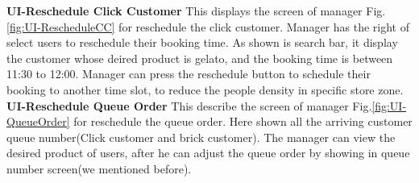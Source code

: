 \documentclass[a4paper,12pt]{report}
\begin{document}
\textbf{UI-Reschedule Click Customer} This displays the screen of manager Fig.\ref{fig:UI-RescheduleCC} for reschedule the click customer. Manager has the right of select users to reschedule their booking time.  As shown is search bar, it display the customer whose deired product is gelato, and the booking time is between 11:30 to 12:00. Manager can press the reschedule button to schedule their booking to another time slot, to reduce the people density in specific store zone. ~\\ 
 
\textbf{UI-Reschedule Queue Order} This describe the screen of manager Fig.\ref{fig:UI-QueueOrder} for reschedule the queue order. Here shown all the arriving customer queue number(Click customer and brick customer). The manager can view the desired product of users, after he can adjust the queue order by showing in queue number screen(we mentioned before).~\\
\end{document}
